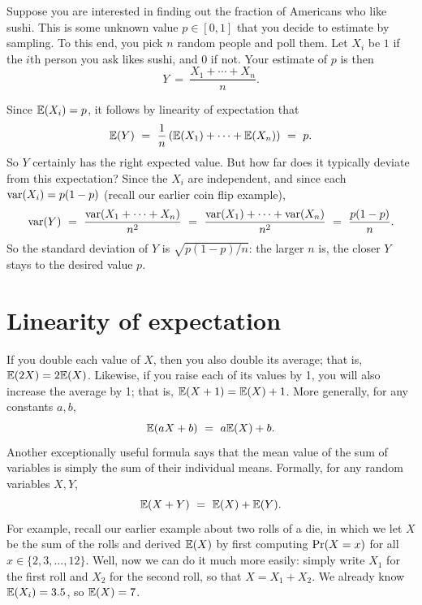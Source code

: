 Suppose you are interested in finding out the fraction of Americans who like sushi. 
This is some unknown value $p \in [0,1]$ that you decide to estimate by sampling.
To this end, you pick $n$ random people and poll them. Let $X_i$ be $1$ if the $i$th
person you ask likes sushi, and $0$ if not. Your estimate of $p$ is then
$$ Y \ = \ \frac{X_1 + \cdots + X_n}{n}.$$

Since $\mathbb{E}(X_i) = p$, it follows by linearity of expectation that
$$
\E(Y)
\ = \ 
\frac{1}{n} \left( \E(X_1) + \cdots + \E(X_n) \right)
\ = \ 
p.
$$
So $Y$ certainly has the right expected value. But how far does it typically
deviate from this expectation? Since the $X_i$ are independent, and since
each $\mbox{\rm var}(X_i) = p(1-p)$ (recall our earlier coin flip example), 
$$ 
\var(Y) 
\ = \ 
\frac{\var(X_1 + \cdots + X_n)}{n^2}
\ = \ 
\frac{\var(X_1) + \cdots + \var(X_n)}{n^2}  
\ = \ 
\frac{p(1-p)}{n}.
$$
So the standard deviation of $Y$ is $\sqrt{p(1-p)/n}$: the larger $n$ is,
the closer $Y$ stays to the desired value $p$.

\section{Linearity of expectation}

If you double each value of $X$, then you also double its average; that is, 
$\mathbb{E}(2X) = 2 \mathbb{E}(X)$. Likewise, if you raise each of its values by 1, you will
also increase the average by 1; that is, $\mathbb{E}(X+1) = \mathbb{E}(X) + 1$. More generally,
for any constants $a,b$,
$$ \mathbb{E}(aX + b) \ = \ a\mathbb{E}(X) + b.$$
Another exceptionally useful formula says that the mean value of the sum of
variables is simply the sum of their individual means. Formally, for 
any random variables $X, Y$,
$$ \mathbb{E}(X+Y) \ = \ \mathbb{E}(X) + \mathbb{E}(Y).$$
For example, recall our earlier example about two
rolls of a die, in which we let $X$ be the sum of the rolls and derived $\mathbb{E}(X)$
by first computing $\mbox{\rm Pr}(X = x)$ for all $x \in \{2,3,\ldots,12\}$. Well, now
we can do it much more easily: simply write $X_1$ for the first roll and $X_2$
for the second roll, so that $X = X_1 + X_2$. We already know $\mathbb{E}(X_i) = 3.5$,
so $\mathbb{E}(X) = 7$.

